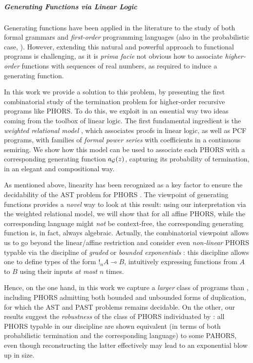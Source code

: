 \subparagraph*{Generating Functions via Linear Logic}

Generating functions have been applied in the literature to the study of
both formal grammars \cite{DBLP:books/sp/KuichS86} and 
 \emph{first-order} programming languages (also in the probabilistic case, \cite{Klinkenberg2021,Klinkenberg2024}).  However, extending this natural and powerful approach to functional programs is challenging, as it is \emph{prima facie} not obvious how to associate \emph{higher-order} functions  with sequences of real numbers, as required to induce a generating function. 


In this work we provide a solution to this problem, by presenting the first combinatorial study of the termination problem for {higher-order} recursive programs like PHORS.
To do this, we exploit in an essential way two ideas coming from the toolbox of linear logic.
The first fundamental ingredient is the \emph{weighted relational model} \cite{DBLP:conf/lics/LairdMMP13}, which associates proofs in linear logic, as well as PCF programs, with families of \emph{formal power series} with coefficients in a continuous semiring.
We show how this model can be used to associate each PHORS with a corresponding generating function $a_{\mathcal{G}}(z)$, capturing its probability of termination, in an elegant and compositional way.

As mentioned above, linearity has been recognized as a key factor to ensure the decidability of the AST problem for PHORS \cite{DBLP:conf/lics/LiMO22}.
The viewpoint of generating functions provides a \emph{novel} way to look at this result:
using our interpretation via the weighted relational model, we will show that for all affine PHORS, while the corresponding language might \emph{not} be context-free, the corresponding generating function is, in fact, always algebraic.
 Actually, the combinatorial viewpoint allows us to go beyond the linear/affine restriction and consider even \emph{non-linear} PHORS typable via the discipline of \emph{graded} or \emph{bounded exponentials} \cite{GIRARD19921, 10.1007/978-3-642-02273-9_8, 10.1007/978-3-642-54833-8_19, 10.1007/978-3-642-54833-8_18}: this discipline allows one to define types of the form $!_n A \multimap B$, intuitively expressing functions from $A$ to $B$ using their inputs \emph{at most} $n$ times. 
 
 Hence, on the one hand, in this work we capture a \emph{larger} class of programs than \cite{DBLP:conf/lics/LiMO22}, including PHORS admitting both bounded and unbounded forms of duplication, for which the AST and PAST problems remains decidable.
On the other, our results suggest the \emph{robustness} of the class of PHORS individuated by \cite{DBLP:conf/lics/LiMO22}: all PHORS typable in our discipline are shown 
 {equivalent} (in terms of both probabilistic termination and the corresponding language) to some PAHORS, even though reconstructing the latter effectively may lead to an exponential blow up in size.


